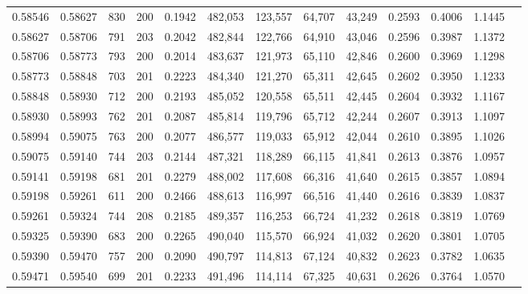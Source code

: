 \begin{tabular}{rrrrrrrrrrrrr}
0.58546 & 0.58627 &   830 & 200 &                                     0.1942 & 482,053 & 123,557 &  64,707 &  43,249 & 0.2593 & 0.4006 & 1.1445 \\
0.58627 & 0.58706 &   791 & 203 &                                     0.2042 & 482,844 & 122,766 &  64,910 &  43,046 & 0.2596 & 0.3987 & 1.1372 \\
0.58706 & 0.58773 &   793 & 200 &                                     0.2014 & 483,637 & 121,973 &  65,110 &  42,846 & 0.2600 & 0.3969 & 1.1298 \\
0.58773 & 0.58848 &   703 & 201 &                                     0.2223 & 484,340 & 121,270 &  65,311 &  42,645 & 0.2602 & 0.3950 & 1.1233 \\
0.58848 & 0.58930 &   712 & 200 &                                     0.2193 & 485,052 & 120,558 &  65,511 &  42,445 & 0.2604 & 0.3932 & 1.1167 \\
0.58930 & 0.58993 &   762 & 201 &                                     0.2087 & 485,814 & 119,796 &  65,712 &  42,244 & 0.2607 & 0.3913 & 1.1097 \\
0.58994 & 0.59075 &   763 & 200 &                                     0.2077 & 486,577 & 119,033 &  65,912 &  42,044 & 0.2610 & 0.3895 & 1.1026 \\
0.59075 & 0.59140 &   744 & 203 &                                     0.2144 & 487,321 & 118,289 &  66,115 &  41,841 & 0.2613 & 0.3876 & 1.0957 \\
0.59141 & 0.59198 &   681 & 201 &                                     0.2279 & 488,002 & 117,608 &  66,316 &  41,640 & 0.2615 & 0.3857 & 1.0894 \\
0.59198 & 0.59261 &   611 & 200 &                                     0.2466 & 488,613 & 116,997 &  66,516 &  41,440 & 0.2616 & 0.3839 & 1.0837 \\
0.59261 & 0.59324 &   744 & 208 &                                     0.2185 & 489,357 & 116,253 &  66,724 &  41,232 & 0.2618 & 0.3819 & 1.0769 \\
0.59325 & 0.59390 &   683 & 200 &                                     0.2265 & 490,040 & 115,570 &  66,924 &  41,032 & 0.2620 & 0.3801 & 1.0705 \\
0.59390 & 0.59470 &   757 & 200 &                                     0.2090 & 490,797 & 114,813 &  67,124 &  40,832 & 0.2623 & 0.3782 & 1.0635 \\
0.59471 & 0.59540 &   699 & 201 &                                     0.2233 & 491,496 & 114,114 &  67,325 &  40,631 & 0.2626 & 0.3764 & 1.0570 \\

\end{tabular}

